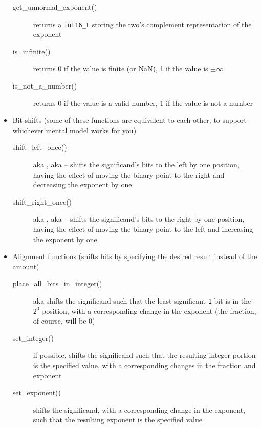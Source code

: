 \begin{itemize}
\begin{description}
        \item[get\_unnormal\_exponent()] returns a \lstinline{int16_t} storing the two's complement representation of the exponent
        \item[is\_infinite()] returns 0 if the value is finite (or NaN), 1 if the value is $\pm\infty$
        \item[is\_not\_a\_number()] returns 0 if the value is a valid number, 1 if the value is not a number
    \end{description}
    \item Bit shifts (some of these functions are equivalent to each other, to support whichever mental model works for you)
    \begin{description}
        \item[shift\_left\_once()] aka , aka  -- shifts the significand's bits to the left by one position, having the effect of moving the binary point to the right and decreasing the exponent by one
        \item[shift\_right\_once()] aka , aka  -- shifts the significand's bits to the right by one position, having the effect of moving the binary point to the left and increasing the exponent by one
    \end{description}
    \item Alignment functions (shifts bits by specifying the desired result instead of the amount)
    \begin{description}
        \item[place\_all\_bits\_in\_integer()] aka  shifts the significand such that the least-significant \lstinline{1} bit is in the $2^0$ position, with a corresponding change in the exponent (the fraction, of course, will be 0)
        \item[set\_integer()] if possible, shifts the significand such that the resulting integer portion is the specified value, with a corresponding changes in the fraction and exponent
        \item[set\_exponent()] shifts the significand, with a corresponding change in the exponent, such that the resulting exponent is the specified value

\end{description}
\end{itemize}
